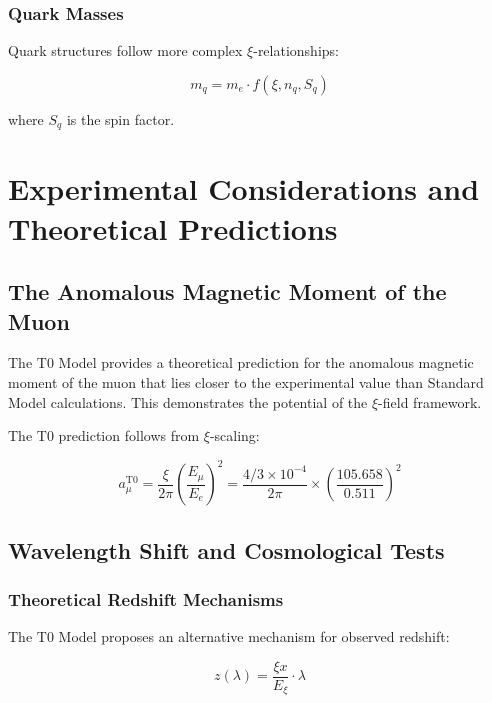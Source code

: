 \documentclass[12pt,a4paper]{report}
\newcommand{\Exi}{E_\xi}
\begin{document}
	\subsection{Quark Masses}
	
	Quark structures follow more complex $\xi$-relationships:
	
	\begin{equation}
		m_q = m_e \cdot f(\xi, n_q, S_q)
	\end{equation}
	
	where $S_q$ is the spin factor.
	
	\chapter{Experimental Considerations and Theoretical Predictions}
	
	\section{The Anomalous Magnetic Moment of the Muon}
	
	\begin{experimental}
		The T0 Model provides a theoretical prediction for the anomalous magnetic moment of the muon that lies closer to the experimental value than Standard Model calculations. This demonstrates the potential of the $\xi$-field framework.
	\end{experimental}
	
	The T0 prediction follows from $\xi$-scaling:
	
	\begin{equation}
		a_\mu^{\text{T0}} = \frac{\xi}{2\pi} \left(\frac{E_\mu}{E_e}\right)^2 = \frac{4/3 \times 10^{-4}}{2\pi} \times \left(\frac{105.658}{0.511}\right)^2
	\end{equation}
	
	\section{Wavelength Shift and Cosmological Tests}
	
	\subsection{Theoretical Redshift Mechanisms}
	
	The T0 Model proposes an alternative mechanism for observed redshift:
	
	\begin{equation}
		z(\lambda) = \frac{\xi x}{\Exi} \cdot \lambda
	\end{equation}
	
\end{document}
